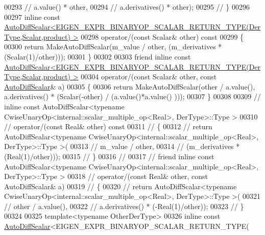 \begin{DoxyCode}
00293 \textcolor{comment}{//         a.value() * other,}
00294 \textcolor{comment}{//         a.derivatives() * other);}
00295 \textcolor{comment}{//     \}}
00296 
00297     \textcolor{keyword}{inline} \textcolor{keyword}{const} 
      \hyperlink{class_eigen_1_1_auto_diff_scalar}{AutoDiffScalar<EIGEN\_EXPR\_BINARYOP\_SCALAR\_RETURN\_TYPE(DerType,Scalar,product) >}
00298     operator/(\textcolor{keyword}{const} Scalar& other)\textcolor{keyword}{ const}
00299 \textcolor{keyword}{    }\{
00300       \textcolor{keywordflow}{return} MakeAutoDiffScalar(m\_value / other, (m\_derivatives * (Scalar(1)/other)));
00301     \}
00302 
00303     \textcolor{keyword}{friend} \textcolor{keyword}{inline} \textcolor{keyword}{const} 
      \hyperlink{class_eigen_1_1_auto_diff_scalar}{AutoDiffScalar<EIGEN\_EXPR\_BINARYOP\_SCALAR\_RETURN\_TYPE(DerType,Scalar,product) >}
00304     operator/(\textcolor{keyword}{const} Scalar& other, \textcolor{keyword}{const} \hyperlink{class_eigen_1_1_auto_diff_scalar}{AutoDiffScalar}& a)
00305     \{
00306       \textcolor{keywordflow}{return} MakeAutoDiffScalar(other / a.value(), a.derivatives() * (Scalar(-other) / (a.value()*a.value()
      )));
00307     \}
00308 
00309 \textcolor{comment}{//     inline const AutoDiffScalar<typename CwiseUnaryOp<internal::scalar\_multiple\_op<Real>, DerType>::Type
       >}
00310 \textcolor{comment}{//     operator/(const Real& other) const}
00311 \textcolor{comment}{//     \{}
00312 \textcolor{comment}{//       return AutoDiffScalar<typename CwiseUnaryOp<internal::scalar\_multiple\_op<Real>, DerType>::Type >(}
00313 \textcolor{comment}{//         m\_value / other,}
00314 \textcolor{comment}{//         (m\_derivatives * (Real(1)/other)));}
00315 \textcolor{comment}{//     \}}
00316 \textcolor{comment}{//}
00317 \textcolor{comment}{//     friend inline const AutoDiffScalar<typename CwiseUnaryOp<internal::scalar\_multiple\_op<Real>,
       DerType>::Type >}
00318 \textcolor{comment}{//     operator/(const Real& other, const AutoDiffScalar& a)}
00319 \textcolor{comment}{//     \{}
00320 \textcolor{comment}{//       return AutoDiffScalar<typename CwiseUnaryOp<internal::scalar\_multiple\_op<Real>, DerType>::Type >(}
00321 \textcolor{comment}{//         other / a.value(),}
00322 \textcolor{comment}{//         a.derivatives() * (-Real(1)/other));}
00323 \textcolor{comment}{//     \}}
00324 
00325     \textcolor{keyword}{template}<\textcolor{keyword}{typename} OtherDerType>
00326     \textcolor{keyword}{inline} \textcolor{keyword}{const} \hyperlink{class_eigen_1_1_auto_diff_scalar}{AutoDiffScalar}<EIGEN\_EXPR\_BINARYOP\_SCALAR\_RETURN\_TYPE(

\end{DoxyCode}
